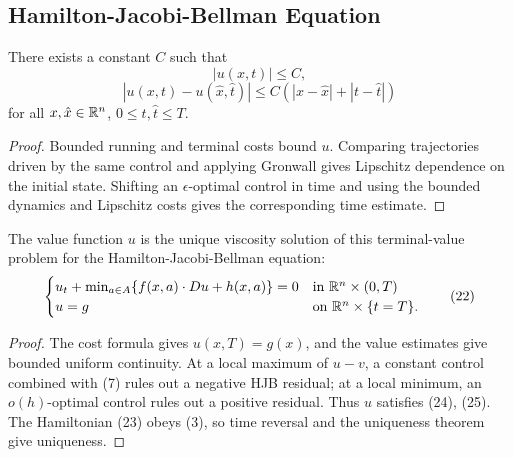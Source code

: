 \subsection{Hamilton-Jacobi-Bellman Equation}

\begin{lemma}
\label{lem:value-function-estimates}

There exists a constant $C$ such that
\[
|u(x,t)| \leq C,
\]
\[
|u(x,t) - u(\hat{x},\hat{t})| \leq C(|x - \hat{x}| + |t - \hat{t}|)
\]
for all $x, \hat{x} \in \mathbb{R}^n$, $0 \leq t, \hat{t} \leq T$.
\end{lemma}

\begin{proof}
\sketch Bounded running and terminal costs bound $u$. Comparing trajectories driven by the same control and applying Gronwall gives Lipschitz dependence on the initial state. Shifting an $\epsilon$-optimal control in time and using the bounded dynamics and Lipschitz costs gives the corresponding time estimate.
\end{proof}

\begin{theorem}
\label{thm:value-function-solves-hjb-equation}

The value function $u$ is the unique viscosity solution of this terminal-value problem for the Hamilton-Jacobi-Bellman equation:
\[
\begin{cases}
u_t + \min_{a \in A}\{f(x,a) \cdot Du + h(x,a)\} = 0 & \text{in } \mathbb{R}^n \times (0,T) \\
u = g & \text{on } \mathbb{R}^n \times \{t = T\}.
\end{cases}
\tag{22}
\]
\end{theorem}

\begin{proof}
\sketch The cost formula gives $u(x,T)=g(x)$, and the value estimates give bounded uniform continuity. At a local maximum of $u-v$, a constant control combined with (7) rules out a negative HJB residual; at a local minimum, an $o(h)$-optimal control rules out a positive residual. Thus $u$ satisfies (24), (25). The Hamiltonian (23) obeys (3), so time reversal and the uniqueness theorem give uniqueness.
\end{proof}

